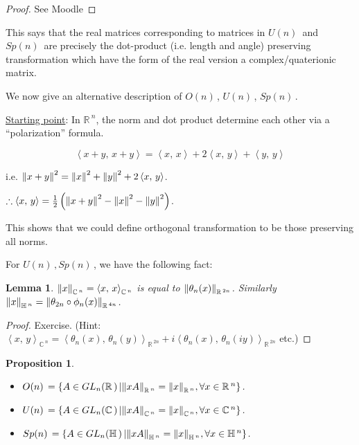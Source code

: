 \documentclass[12pt,a4paper]{article}
\newcommand{\rR}{\ensuremath{\mathbb{R}\,}}
\newcommand{\cC}{\ensuremath{\mathbb{C}\,}}
\newcommand{\hH}{\ensuremath{\mathbb{H}\,}}
\newcommand{\glnr}{\ensuremath{GL_n(\rR)\,}}
\newcommand{\glnc}{\ensuremath{GL_n(\cC)\,}}
\newcommand{\glnh}{\ensuremath{GL_n(\hH)\,}}
\newcommand{\gon}{\ensuremath{O(n)\,}}
\newcommand{\gun}{\ensuremath{U(n)\,}}
\newcommand{\gspn}{\ensuremath{Sp(n)\,}}
\newcommand{\ipm}[2]{\ensuremath{\left\langle #1, \, #2 \right\rangle}}
\newcommand{\ul}[1]{\underline{#1}}
\newtheorem{lemma}[thm]{Lemma}
\newtheorem{prop}[thm]{Proposition}
\begin{document}
\begin{proof}
See Moodle
\end{proof}

This says that the real matrices corresponding to matrices in $\gun$ and $\gspn$ are precisely the dot-product (i.e. length and angle) preserving transformation which have the form of the real version a complex/quaterionic matrix.

We now give an alternative description of \gon , \gun , \gspn .

\ul{Starting point}: In $\rR^n$, the norm and dot product determine each other via a ``polarization'' formula.

\[\ipm{x+y}{x+y}=\ipm{x}{x}+2\ipm{x}{y}+\ipm{y}{y}\]

i.e. $\norm{x+y}^2=\norm{x}^2+\norm{y}^2+2\ipm{x}{y}$.

$\therefore \ipm{x}{y}=\frac{1}{2}\left(\norm{x+y}^2 -\norm{x}^2-\norm{y}^2 \right) $.

This shows that we could define orthogonal transformation to be those preserving all norms.

For $\gun, \gspn$, we have the following fact:

\begin{lemma}
$\norm{x}_{\cC^n}=\ipm{x}{x}_{\cC^n}$ is equal to $\norm{\theta_n(x)}_{\rR^{2n}}$. Similarly $\norm{x}_{\hH^n}=\norm{\theta_{2n}\circ \phi_n(x)}_{\rR^{4n}}$.
\end{lemma}

\begin{proof}
Exercise. (Hint: $\ipm{x}{y}_{\cC^n}=\ipm{\theta_n(x)}{\theta_n(y)}_{\rR^{2n}}+i\ipm{\theta_n(x)}{\theta_n(iy)}_{\rR^{2n}}$ etc.)
\end{proof}

\begin{prop}
\phantom{a}\\
\begin{itemize}
\item[1)] $\gon=\{A\in\glnr | \norm{xA}_{\rR^{n}}=\norm{x}_{\rR^{n}}, \forall x\in\rR^n\}$.
\item[2)] $\gun=\{A\in\glnc | \norm{xA}_{\cC^{n}}=\norm{x}_{\cC^{n}}, \forall x\in\cC^n\}$.
\item[3)] $\gspn=\{A\in\glnh | \norm{xA}_{\hH^{n}}=\norm{x}_{\hH^{n}}, \forall x\in\hH^n\}$.
\end{itemize}
\end{prop}
\end{document}
